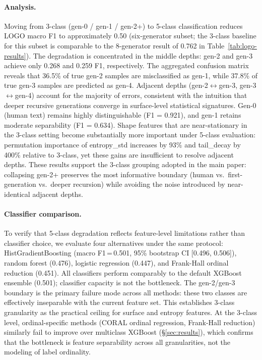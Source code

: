 \paragraph{Analysis.}
Moving from 3-class (gen-0 / gen-1 / gen-2+) to 5-class classification reduces LOGO macro F1 to approximately 0.50 (six-generator subset; the 3-class baseline for this subset is comparable to the 8-generator result of 0.762 in Table~\ref{tab:logo-results}).
The degradation is concentrated in the middle depths: gen-2 and gen-3 achieve only 0.268 and 0.259 F1, respectively.
The aggregated confusion matrix reveals that 36.5\% of true gen-2 samples are misclassified as gen-1, while 37.8\% of true gen-3 samples are predicted as gen-4.
Adjacent depths (gen-2$\leftrightarrow$gen-3, gen-3$\leftrightarrow$gen-4) account for the majority of errors, consistent with the intuition that deeper recursive generations converge in surface-level statistical signatures.
Gen-0 (human text) remains highly distinguishable (F1 = 0.921), and gen-1 retains moderate separability (F1 = 0.634).
Shape features that are near-stationary in the 3-class setting become substantially more important under 5-class evaluation: permutation importance of entropy\_std increases by 93\% and tail\_decay by 400\% relative to 3-class, yet these gains are insufficient to resolve adjacent depths.
These results support the 3-class grouping adopted in the main paper: collapsing gen-2+ preserves the most informative boundary (human vs.\ first-generation vs.\ deeper recursion) while avoiding the noise introduced by near-identical adjacent depths.

\paragraph{Classifier comparison.}
To verify that 5-class degradation reflects feature-level limitations rather than classifier choice, we evaluate four alternatives under the same protocol: HistGradientBoosting (macro F1\,=\,0.501, 95\% bootstrap CI [0.496, 0.506]), random forest (0.476), logistic regression (0.447), and Frank-Hall ordinal reduction (0.451).
All classifiers perform comparably to the default XGBoost ensemble (0.501); classifier capacity is not the bottleneck.
The gen-2/gen-3 boundary is the primary failure mode across all methods: these two classes are effectively inseparable with the current feature set. This establishes 3-class granularity as the practical ceiling for surface and entropy features.
At the 3-class level, ordinal-specific methods (CORAL ordinal regression, Frank-Hall reduction) similarly fail to improve over multiclass XGBoost (\S\ref{sec:results}), which confirms that the bottleneck is feature separability across all granularities, not the modeling of label ordinality.
